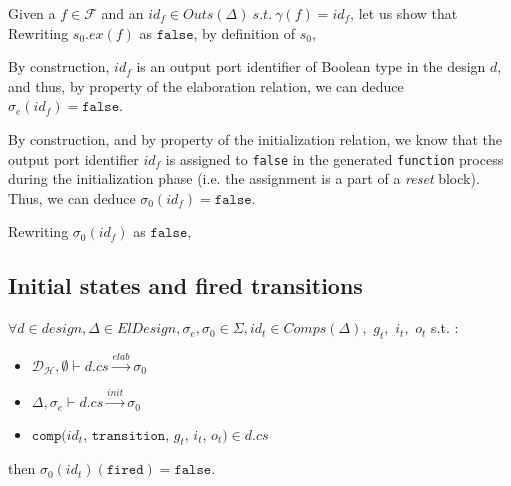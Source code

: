 \documentclass[dvipsnames,12pt]{article}
\begin{document}
\begin{niproof}
  Given a $f\in\mathcal{F}$ and an
  $id_f\in{}Outs(\Delta)~s.t.~\gamma(f)=id_f$, let us show that
  \\

  Rewriting $s_0.ex(f)$ as $\mathtt{false}$, by definition of $s_0$,

  By construction, $id_f$ is an output port identifier of Boolean type
  in the \hvhdl{} design $d$, and thus, by property of the \hvhdl{}
  elaboration relation, we can deduce $\sigma_e(id_f)=\mathtt{false}$.

  By construction, and by property of the initialization relation, we
  know that the output port identifier $id_f$ is assigned to
  \texttt{false} in the generated \texttt{function} process during the
  initialization phase (i.e. the assignment is a part of a
  \emph{reset} block). Thus, we can deduce
  $\sigma_0(id_f)=\mathtt{false}$.
  
  \noindent{}Rewriting $\sigma_0(id_f)$ as $\mathtt{false}$,
  
\end{niproof}

\subsection{Initial states and fired transitions}
\label{sec:init-states-fired-false}

\begin{lemma}
  \label{lem:init-states-fired-false}
  $\forall{}d\in{}design,\Delta\in{}ElDesign,\sigma_e,\sigma_0\in\Sigma,id_t\in{}Comps(\Delta),$
  $g_t,$ $i_t,$ $o_t$ s.t. :
  \begin{itemize}
  \item $\mathcal{D}_\mathcal{H},\emptyset\vdash{}d.cs\xrightarrow{elab}\sigma_0$
  \item $\Delta,\sigma_e\vdash{}d.cs\xrightarrow{init}\sigma_0$
  \item $\mathtt{comp}(id_t$, $\texttt{transition}$, $g_t$, $i_t$,
    $o_t)\in{}d.cs$
  \end{itemize}
  then $\sigma_0(id_t)(\texttt{fired})=\mathtt{false}$.
\end{lemma}
\end{document}
